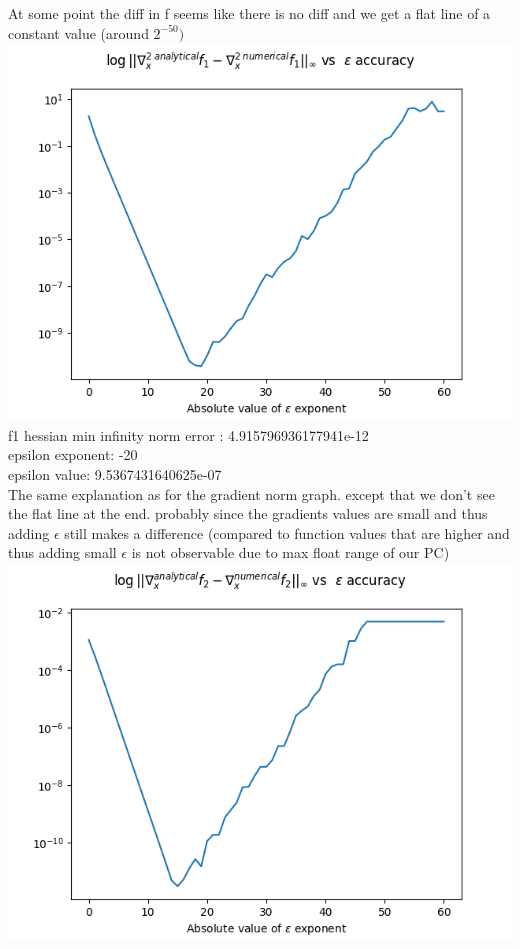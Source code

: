 \documentclass[12pt]{article}
\begin{document}
At some point the diff in f seems like there is no diff and we get a flat line of a constant value (around $2^{-50})$\\
\includegraphics[scale=0.7]{f1_hessian_plot}\\
f1 hessian min infinity norm error : 4.915796936177941e-12\\ 
epsilon exponent: -20\\
epsilon value: 9.5367431640625e-07\\
The same explanation as for the gradient norm graph. except that we don't see the flat line at the end. probably since the gradients values are small and thus adding $\epsilon$ still makes a difference (compared to function values that are higher and thus adding small $\epsilon$ is not observable due to max float range of our PC)\\
\includegraphics[scale=0.7]{f2_grad_plot}\\
\end{document}
